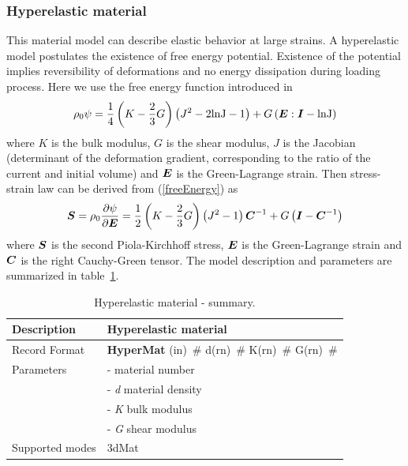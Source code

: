 \documentclass[a4paper]{article}
\newcommand{\mbf}[1]{\mbox{\boldmath$#1$}}
\newcommand{\descitem}[1]{{\noindent \bf #1}}
\newcommand{\elemparam}[2]{{{#1\tiny (#2)}~\#}}
\newcommand{\param}[1]{{\it #1}}
\begin{document}
\subsubsection{Hyperelastic material}
This material model can describe elastic behavior at large strains.
A hyperelastic model postulates the existence of free energy potential. Existence of the potential implies reversibility of deformations and no energy dissipation during loading process. Here we use the free energy function introduced in \cite{SimoHughes}
\begin{equation}\label{freeEnergy}
\rho_0 \psi = \frac{1}{4} \left(K - \frac{2}{3}G \right) \left( J^2 - 2 \rm{ln}J -1\right) + G \left(\mbf{E}:\mbf{I} - \rm{ln}J \right)
\end{equation}
where $K$ is the bulk modulus, $G$ is the shear modulus, $J$ is the Jacobian (determinant of the deformation gradient, corresponding to the ratio of the current and initial volume) and $\mbf{E}$ is the Green-Lagrange strain.
Then stress-strain law can be derived from (\ref{freeEnergy}) as
\begin{equation}
\mbf{S} = \rho_0 \frac{\partial \psi}{\partial \mbf{E}} = \frac{1}{2}\left(K - \frac{2}{3}G \right) \left(J^2 -1 \right)\mbf{C}^{-1} + G \left(\mbf{I} -\mbf{C}^{-1} \right)
\end{equation}
where $\mbf{S}$ is the second Piola-Kirchhoff stress, $\mbf{E}$ is the Green-Lagrange strain and $\mbf{C}$ is the right Cauchy-Green tensor.
The model description and parameters are summarized in table~\ref{hyperElMat_table}.
\begin{table}[!htb]
\begin{tabular}{|l|p{9cm}|}
\hline
Description & Hyperelastic material\\
\hline
Record Format & \descitem{HyperMat}  \elemparam{}{in}
\elemparam{d}{rn} \elemparam{K}{rn} \elemparam{G}{rn} \\
Parameters &- \param{} material number\\
&- \param{d} material density\\
&- \param{K} bulk modulus\\
&- \param{G} shear modulus\\
Supported modes& 3dMat\\
\hline
\end{tabular}
\caption{Hyperelastic material - summary.}
\label{hyperElMat_table}
\end{table}
\end{document}
